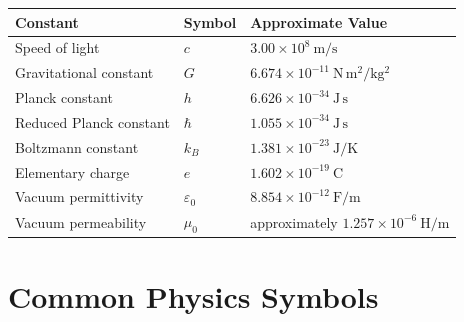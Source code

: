 \documentclass[11pt,a4paper]{article}
\begin{document}
\begin{longtable}{p{} p{} p{}}
\toprule
\textbf{Constant} & \textbf{Symbol} & \textbf{Approximate Value} \\
\midrule
Speed of light & $c$ & $3.00\times10^8\ \mathrm{m/s}$ \\

Gravitational constant & $G$ & $6.674\times10^{-11}\ \mathrm{N\,m^2/kg^2}$ \\

Planck constant & $h$ & $6.626\times10^{-34}\ \mathrm{J\,s}$ \\

Reduced Planck constant & $\hbar$ & $1.055\times10^{-34}\ \mathrm{J\,s}$ \\

Boltzmann constant & $k_B$ & $1.381\times10^{-23}\ \mathrm{J/K}$ \\

Elementary charge & $e$ & $1.602\times10^{-19}\ \mathrm{C}$ \\

Vacuum permittivity & $\varepsilon_0$ & $8.854\times10^{-12}\ \mathrm{F/m}$ \\

Vacuum permeability & $\mu_0$ & approximately $1.257\times10^{-6}\ \mathrm{H/m}$ \\

\bottomrule
\end{longtable}

\section{Common Physics Symbols}
\end{document}
